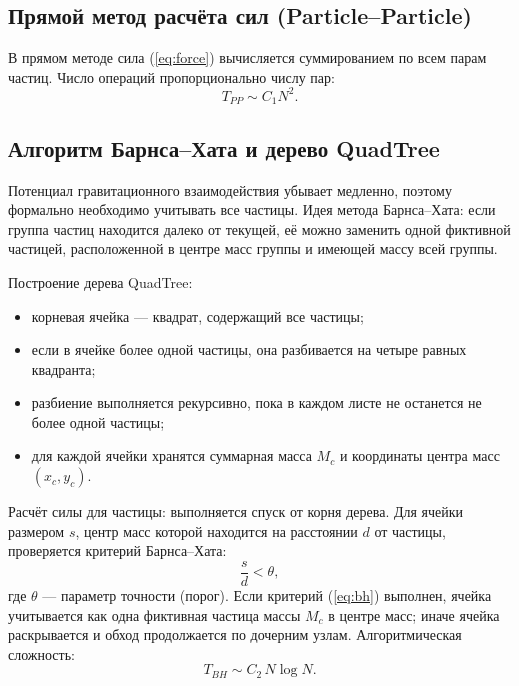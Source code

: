 \documentclass[12pt,a4paper]{article}
\begin{document}
	\subsection{Прямой метод расчёта сил (Particle--Particle)}
	
	В прямом методе сила (\ref{eq:force}) вычисляется суммированием по всем парам частиц. Число операций пропорционально числу пар:
	\begin{equation}
		T_{PP} \sim C_1 N^2 .
		\label{eq:cpp}
	\end{equation}
	
	\subsection{Алгоритм Барнса--Хата и дерево QuadTree}
	
	Потенциал гравитационного взаимодействия убывает медленно, поэтому формально необходимо учитывать все частицы. Идея метода Барнса--Хата: если группа частиц находится далеко от текущей, её можно заменить одной фиктивной частицей, расположенной в центре масс группы и имеющей массу всей группы.
	
	Построение дерева QuadTree:
	\begin{itemize}
		\item корневая ячейка --- квадрат, содержащий все частицы;
		\item если в ячейке более одной частицы, она разбивается на четыре равных квадранта;
		\item разбиение выполняется рекурсивно, пока в каждом листе не останется не более одной частицы;
		\item для каждой ячейки хранятся суммарная масса $M_c$ и координаты центра масс $(x_c, y_c)$.
	\end{itemize}
	
	Расчёт силы для частицы: выполняется спуск от корня дерева. Для ячейки размером $s$, центр масс которой находится на расстоянии $d$ от частицы, проверяется критерий Барнса--Хата:
	\begin{equation}
		\frac{s}{d} < \theta ,
		\label{eq:bh}
	\end{equation}
	где $\theta$ --- параметр точности (порог). Если критерий (\ref{eq:bh}) выполнен, ячейка учитывается как одна фиктивная частица массы $M_c$ в центре масс; иначе ячейка раскрывается и обход продолжается по дочерним узлам. Алгоритмическая сложность:
	\begin{equation}
		T_{BH} \sim C_2\, N \log N .
		\label{eq:cbh}
	\end{equation}
	
\end{document}
